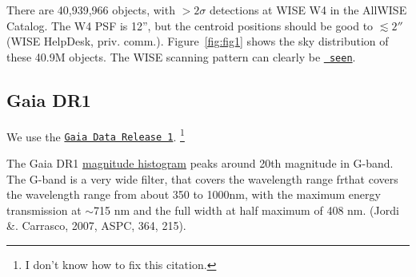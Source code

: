 \documentclass[11pt,a4paper]{article}
\begin{document}
{{    There are 40,939,966 objects, with $>2\sigma$ detections at WISE
    W4 in the AllWISE Catalog. The W4 PSF is 12'', but the centroid
    positions should be good to $\lesssim2''$ (WISE HelpDesk,
    priv. comm.).  Figure~\ref{fig:fig1} shows the sky distribution of
    these 40.9M objects.  The WISE scanning pattern can clearly be 
    \href{http://wise2.ipac.caltech.edu/docs/release/allwise/expsup/sec4_2.html}{{\tt
      seen}}.

    \subsection{Gaia DR1} 
    We use the \href{https://www.cosmos.esa.int/web/gaia/dr1}{{\tt Gaia Data Release 1}}.
    \citep{Gaia16a, Gaia16b}\footnote{I don't know how to fix this citation.}

    The Gaia DR1
    \href{https://www.cosmos.esa.int/documents/29201/1125416/magnitude+histogram+placeholder.png/}
    {magnitude histogram} peaks around 20th magnitude in G-band. The
    G-band is a very wide filter, that covers the wavelength range frthat
    covers the wavelength range from about 350 to 1000nm, with the maximum
    energy transmission at $\sim$715 nm and the full width at half maximum
    of 408 nm.  (Jordi \&. Carrasco, 2007, ASPC, 364, 215).
    
}}
\end{document}
